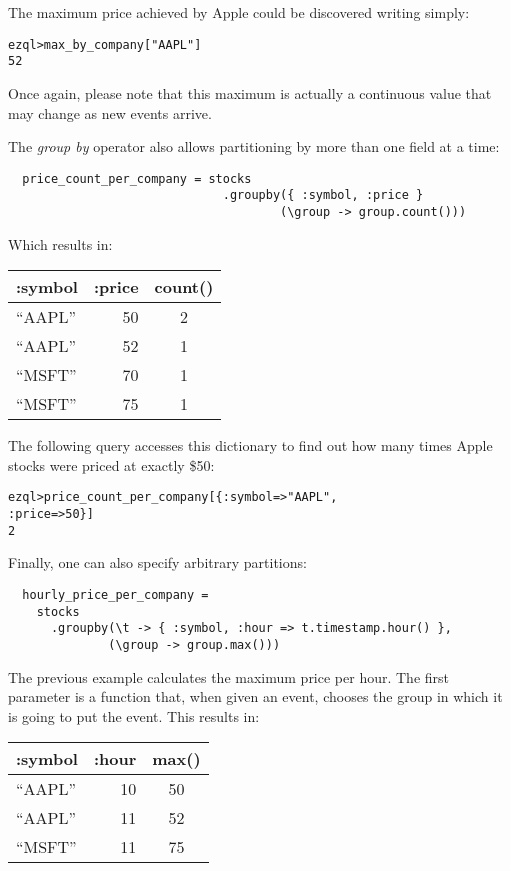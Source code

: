 \documentclass{report}
\newenvironment{evaluation}
{
  \framed
  \begin{alltt}
}
{
  \end{alltt}
  \endframed
}
\begin{document}
The maximum price achieved by Apple could be discovered writing
simply:

\begin{evaluation}
  ezql> max_by_company["AAPL"]
  52
\end{evaluation}

Once again, please note that this maximum is actually a continuous
value that may change as new events arrive.

The \emph{group by} operator also allows partitioning by more than one
field at a time:

\begin{verbatim}
  price_count_per_company = stocks
                              .groupby({ :symbol, :price }
                                      (\group -> group.count()))
\end{verbatim}

Which results in:

\begin{tabular}{ |l|r|c| }
  \hline
  :symbol & :price & count() \\
  \hline
  ``AAPL'' & 50 & 2 \\
  ``AAPL'' & 52 & 1 \\
  ``MSFT'' & 70 & 1 \\
  ``MSFT'' & 75 & 1 \\
  \hline
\end{tabular}

The following query accesses this dictionary to find out how many
times Apple stocks were priced at exactly \$50:

\begin{evaluation}
  ezql> price_count_per_company[\{ :symbol => "AAPL",
                                  :price => 50 \}]
  2
\end{evaluation}

Finally, one can also specify arbitrary partitions:

\begin{verbatim}
  hourly_price_per_company =
    stocks
      .groupby(\t -> { :symbol, :hour => t.timestamp.hour() },
              (\group -> group.max()))
\end{verbatim}

The previous example calculates the maximum price per hour. The first
parameter is a function that, when given an event, chooses the group
in which it is going to put the event. This results in:

\begin{tabular}{ |l|r|c| }
  \hline
  :symbol & :hour & max() \\
  \hline
  ``AAPL'' & 10 & 50 \\
  ``AAPL'' & 11 & 52 \\
  ``MSFT'' & 11 & 75 \\
  \hline
\end{tabular}
\end{document}
